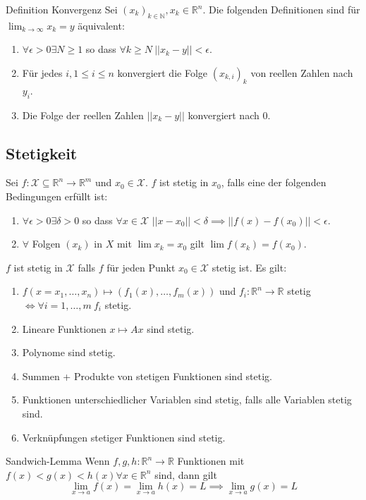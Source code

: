 \documentclass[a4paper,10pt]{article}
\def\R{\mathbb{R}}
\def\X{\mathcal{X}}
\begin{document}
\begin{mainbox}{Definition Konvergenz}
  Sei \((x_k)_{k \in \mathbb{N}}, x_k \in \R^n\). Die folgenden Definitionen sind für \(\lim_{k\to\infty}x_k = y\) äquivalent:
  \begin{enumerate}
    \item \(\forall \epsilon > 0 \exists N \ge 1\) so dass \(\forall k \ge N \ ||x_k - y|| < \epsilon\).
    \item Für jedes \(i, 1 \le i \le n\) konvergiert die Folge \((x_{k,i})_k\) von reellen Zahlen nach \(y_i\).
    \item Die Folge der reellen Zahlen \(||x_k - y||\) konvergiert nach \(0\).
  \end{enumerate}
\end{mainbox}
\subsection{Stetigkeit}
Sei \(f: \X \subseteq \R^n \to \R^m\)  und \(x_0 \in \X\). \(f\) ist stetig in \(x_0\), falls eine der folgenden Bedingungen erfüllt ist:
\begin{enumerate}
  \item \(\forall \epsilon > 0 \exists \delta > 0\) so dass \(\forall x \in \X \) \(||x - x_0|| < \delta \implies ||f(x) - f(x_0)|| < \epsilon\).
  \item \(\forall\) Folgen \((x_k)\) in \(X\) mit \(\lim x_k = x_0\) gilt \(\lim f(x_k) = f(x_0)\).
\end{enumerate}
\(f\) ist stetig in \(\X\) falls \(f\) für jeden Punkt \(x_0 \in \X\) stetig ist. Es gilt:
\begin{enumerate}
  \item \(f(x = x_1, \ldots, x_n) \mapsto (f_1(x),\ldots,f_m(x))\) und \(f_i: \R^n \to \R\) stetig \(\iff \forall i = 1, \ldots, m \ f_i\) stetig.
  \item Lineare Funktionen \(x \mapsto Ax\) sind stetig.
  \item Polynome sind stetig.
  \item Summen + Produkte von stetigen Funktionen sind stetig.
  \item Funktionen unterschiedlicher Variablen sind stetig, falls alle Variablen stetig sind.
  \item Verknüpfungen stetiger Funktionen sind stetig.
\end{enumerate}
\begin{mainbox}{Sandwich-Lemma}
  Wenn \(f, g, h: \R^n \to \R\) Funktionen mit \(f(x) < g(x) < h(x) \forall x \in \R^n\) sind, dann gilt
  \[\lim_{x\to a} f(x) = \lim_{x \to a} h(x) = L \implies \lim_{x\to a} g(x) = L\]
\end{mainbox}
\end{document}
